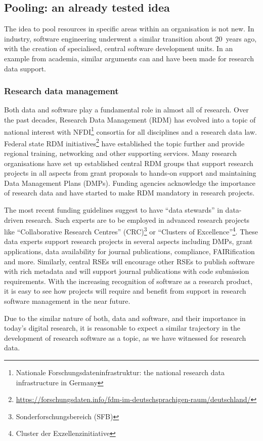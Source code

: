 \documentclass[10pt,letterpaper]{article}
\begin{document}
\subsection*{Pooling: an already tested idea}
The idea to pool resources in specific areas within an organisation is not new.
In industry, software engineering underwent a similar transition about 20 years ago, with the creation of specialised, central software development units.
In an example from academia, similar arguments can and have been made for research data support.

\subsubsection*{Research data management}
Both data and software play a fundamental role in almost all of research.
Over the past decades, Research Data Management (RDM) has evolved into a topic of national interest with NFDI\footnote{Nationale Forschungsdateninfrastruktur: the national research data infrastructure in Germany} consortia for all disciplines and a research data law.
Federal state RDM initiatives\footnote{\url{https://forschungsdaten.info/fdm-im-deutschsprachigen-raum/deutschland/}} have established the topic further and provide regional training, networking and other supporting services.
Many research organisations have set up established central RDM groups that support research projects in all aspects from grant proposals to hands-on support and maintaining Data Management Plans (DMPs).
Funding agencies acknowledge the importance of research data and have started to make RDM mandatory in research projects.

The most recent funding guidelines suggest to have “data stewards” in data-driven research.
Such experts are to be employed in advanced research projects like “Collaborative Research Centres” (CRC)\footnote{Sonderforschungsbereich (SFB)} or “Clusters of Excellence”\footnote{Cluster der Exzellenzinitiative}.
These data experts support research projects in several aspects including DMPs, grant applications, data availability for journal publications, compliance, FAIRification and more.
Similarly, central RSEs will encourage other RSEs to publish software with rich metadata and will support journal publications with code submission requirements.
With the increasing recognition of software as a research product, it is easy to see how projects will require and benefit from support in research software management in the near future.

Due to the similar nature of both, data and software, and their importance in today's digital research, it is reasonable to expect a similar trajectory in the development of research software as a topic, as we have witnessed for research data.
\end{document}
